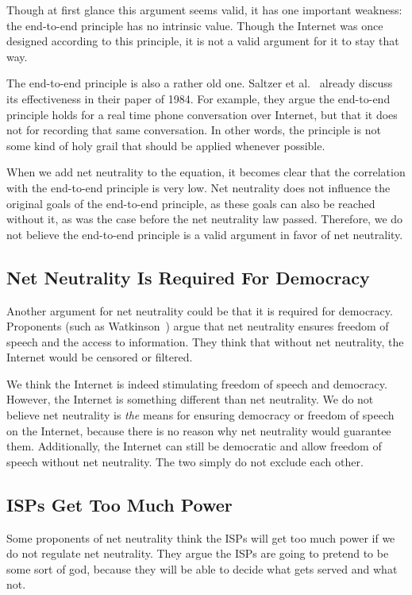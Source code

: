 Though at first glance this argument seems valid, it has one important weakness: the end-to-end principle has no intrinsic value. Though the Internet was once designed according to this principle, it is not a valid argument for it to stay that way.

The end-to-end principle is also a rather old one.
Saltzer et al.~\cite{saltzer1984end} already discuss its effectiveness in their paper of 1984.
For example, they argue the end-to-end principle holds for a real time phone conversation over Internet, but that it does not for recording that same conversation.
In other words, the principle is not some kind of holy grail that should be applied whenever possible.

When we add net neutrality to the equation, it becomes clear that the correlation with the end-to-end principle is very low.
Net neutrality does not influence the original goals of the end-to-end principle, as these goals can also be reached without it, as was the case before the net neutrality law passed.
Therefore, we do not believe the end-to-end principle is a valid argument in favor of net neutrality.

\subsection{Net Neutrality Is Required For Democracy}
Another argument for net neutrality could be that it is required for democracy.
Proponents (such as Watkinson~\cite{watkinson2012democracy}) argue that net neutrality ensures freedom of speech and the access to information.
They think that without net neutrality, the Internet would be censored or filtered.

We think the Internet is indeed stimulating freedom of speech and democracy.
However, the Internet is something different than net neutrality.
We do not believe net neutrality is \emph{the} means for ensuring democracy or freedom of speech on the Internet, because there is no reason why net neutrality would guarantee them.
Additionally, the Internet can still be democratic and allow freedom of speech without net neutrality.
The two simply do not exclude each other.

\subsection{\acp{ISP} Get Too Much Power}
Some proponents of net neutrality think the \acp{ISP} will get too much power if we do not regulate net neutrality.
They argue the \acp{ISP} are going to pretend to be some sort of god, because they will be able to decide what gets served and what not. %

